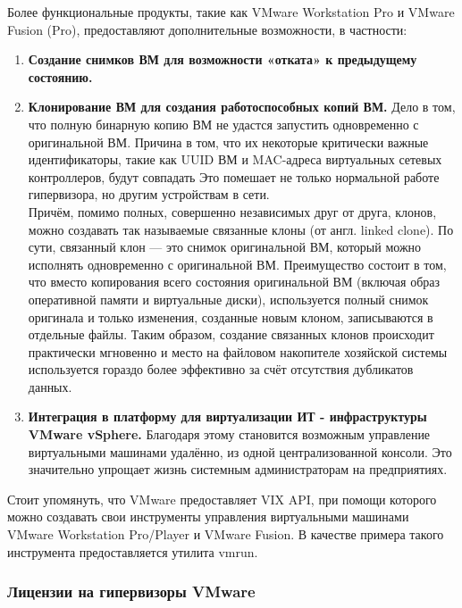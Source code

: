 \documentclass[14pt, a4paper]{article}
\begin{document}
Более функциональные продукты, такие как VMware Workstation Pro и VMware Fusion (Pro),
предоставляют дополнительные возможности, в частности:

\begin{enumerate}
    \item \textbf{Создание снимков ВМ для возможности «отката» к предыдущему состоянию.}
    \item \textbf{Клонирование ВМ для создания работоспособных копий ВМ.} Дело в том, что полную
    бинарную копию ВМ не удастся запустить одновременно с оригинальной ВМ. Причина в том,
    что их некоторые критически важные идентификаторы, такие как UUID ВМ и MAC-адреса
    виртуальных сетевых контроллеров, будут совпадать Это помешает не только нормальной
    работе гипервизора, но другим устройствам в сети.\\

    Причём, помимо полных, совершенно независимых друг от друга, клонов, можно создавать так
называемые связанные клоны (от англ. linked clone). По сути, связанный клон — это снимок
оригинальной ВМ, который можно исполнять одновременно с оригинальной ВМ. Преимущество
состоит в том, что вместо копирования всего состояния оригинальной ВМ (включая образ
оперативной памяти и виртуальные диски), используется полный снимок оригинала и только
изменения, созданные новым клоном, записываются в отдельные файлы. Таким образом, создание
связанных клонов происходит практически мгновенно и место на файловом накопителе хозяйской
системы используется гораздо более эффективно за счёт отсутствия дубликатов данных.

\item \textbf{Интеграция в платформу для виртуализации ИТ - инфраструктуры VMware vSphere.}
Благодаря этому становится возможным управление виртуальными машинами удалённо, из
одной централизованной консоли. Это значительно упрощает жизнь системным
администраторам на предприятиях.
\end{enumerate}

Стоит упомянуть, что VMware предоставляет VIX API, при помощи которого можно создавать свои
инструменты управления виртуальными машинами VMware Workstation Pro/Player и VMware Fusion. В
качестве примера такого инструмента предоставляется утилита vmrun.

\subsubsection*{Лицензии на гипервизоры VMware}
\end{document}
